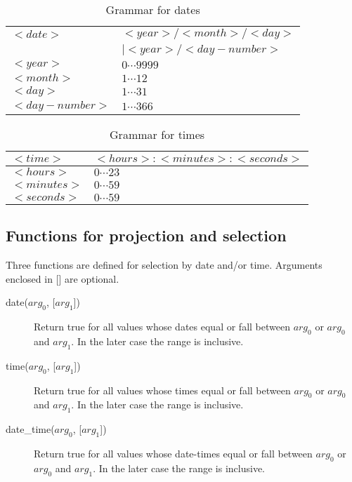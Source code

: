\documentclass[12pt]{article}
\begin{document}
\begin{table}
\caption{Grammar for dates}
\label{tab:dates}

\begin{center}
\begin{tabular}{|l|l|}
\hline
$<date>$       & $<year>/<month>/<day>$ \\
               & $ | <year>/<day-number>$ \\ \hline
$<year>$       & $0 \cdots 9999$ \\ \hline
$<month>$      & $1 \cdots 12$ \\ \hline
$<day>$        & $1 \cdots 31$ \\ \hline
$<day-number>$ & $1 \cdots 366$ \\ \hline
\end{tabular}
\end{center}

\end{table}

\begin{table}
\caption{Grammar for times}
\label{tab:times}

\begin{center}
\begin{tabular}{|l|l|}
\hline
$<time>$       & $<hours>:<minutes>:<seconds>$ \\ \hline
$<hours>$      & $0 \cdots 23$ \\ \hline
$<minutes>$    & $0 \cdots 59$ \\ \hline
$<seconds>$    & $0 \cdots 59$ \\ \hline
\end{tabular}
\end{center}

\end{table}

\subsection{Functions for projection and selection}

Three functions are defined for selection by date and/or time. Arguments
enclosed in [] are optional.

\begin{description}
  
\item [date($arg_{0}$, {[}$arg_{1}${]})] Return true for all values whose
  dates equal or fall between $arg_{0}$ or $arg_{0}$ and $arg_{1}$. In the
  later case the range is inclusive.
  
\item [time($arg_{0}$, {[}$arg_{1}${]})] Return true for all values whose
  times equal or fall between $arg_{0}$ or $arg_{0}$ and $arg_{1}$. In the
  later case the range is inclusive.
  
\item [date\_time($arg_{0}$, {[}$arg_{1}${]})] Return true for all values
  whose date-times equal or fall between $arg_{0}$ or $arg_{0}$ and
  $arg_{1}$. In the later case the range is inclusive.

\end{description}
\end{document}

